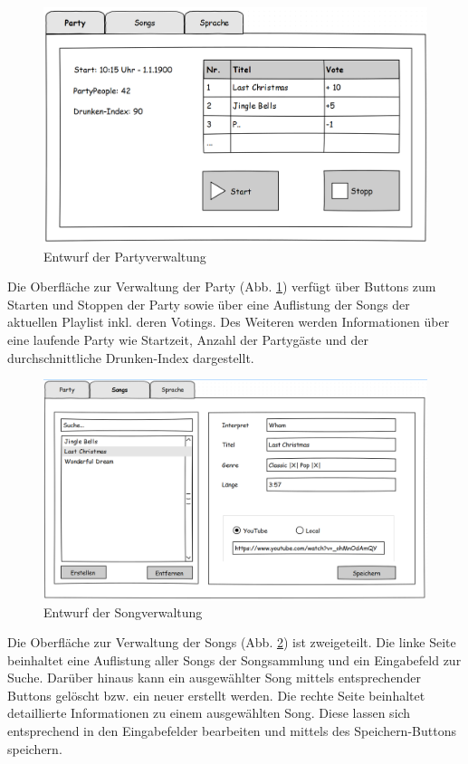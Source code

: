 \begin{figure}[H]
\centering
\includegraphics[width=0.85\linewidth]{Bilder/MockParty}
\caption{Entwurf der Partyverwaltung}
\label{fig:MockParty}
\end{figure}

Die Oberfläche zur Verwaltung der Party (Abb. \ref{fig:MockParty}) verfügt über Buttons zum Starten und Stoppen der Party sowie über eine Auflistung der Songs der aktuellen Playlist inkl. deren Votings. Des Weiteren werden Informationen über eine laufende Party wie Startzeit, Anzahl der Partygäste und der durchschnittliche Drunken-Index dargestellt.

\begin{figure}[H]
\centering
\includegraphics[width=1\linewidth]{Bilder/MockSongVerwaltung}
\caption{Entwurf der Songverwaltung}
\label{fig:MockSongVerwaltung}
\end{figure}

Die Oberfläche zur Verwaltung der Songs (Abb. \ref{fig:MockSongVerwaltung}) ist zweigeteilt. Die linke Seite beinhaltet eine Auflistung aller Songs der Songsammlung und ein Eingabefeld zur Suche. Darüber hinaus kann ein ausgewählter Song mittels entsprechender Buttons gelöscht bzw. ein neuer erstellt werden. Die rechte Seite 
beinhaltet detaillierte Informationen zu einem ausgewählten Song. Diese lassen sich entsprechend in den Eingabefelder bearbeiten und mittels des Speichern-Buttons speichern.

